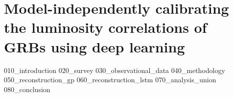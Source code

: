 \chapter{Model-independently calibrating the luminosity correlations of GRBs using deep learning}
{010_introduction}
{020_survey}
{030_observational_data}
{040_methodology}
{050_reconstruction_gp}
{060_reconstruction_lstm}
{070_analysis_union}
{080_conclusion}


